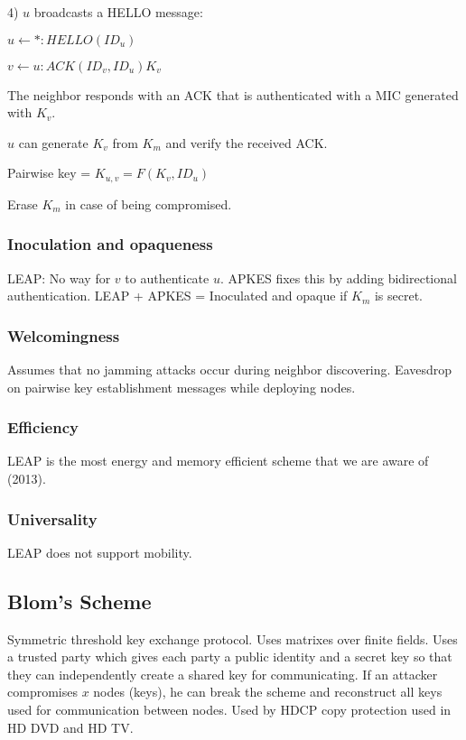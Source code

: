 \documentclass[10pt]{article}
\begin{document}
4) $u$ broadcasts a HELLO message:

$u \leftarrow *: HELLO(ID_u)$

$v \leftarrow u: ACK(ID_v, ID_u)K_v$

The neighbor responds with an ACK that is authenticated with a MIC generated with $K_v$.

$u$ can generate $K_v$ from $K_m$ and verify the received ACK.

Pairwise key = $K_{u,v} = F(K_v, ID_u)$

Erase $K_m$ in case of being compromised.


\subsubsection{Inoculation and opaqueness}

LEAP: No way for $v$ to authenticate $u$. APKES fixes this by adding bidirectional authentication. LEAP + APKES = Inoculated and opaque if $K_m$ is secret.


\subsubsection{Welcomingness}
Assumes that no jamming attacks occur during neighbor discovering. Eavesdrop on pairwise key establishment messages while deploying nodes.


\subsubsection{Efficiency}

LEAP is the most energy and memory efficient scheme that we are aware of (2013).

\subsubsection{Universality}

LEAP does not support mobility.



\subsection{Blom's Scheme}

\noindent

Symmetric threshold key exchange protocol. Uses matrixes over finite fields. Uses a trusted party which gives each party a public identity and a secret key so that they can independently create a shared key for communicating. If an attacker compromises $x$ nodes (keys), he can break the scheme and reconstruct all keys used for communication between nodes. Used by HDCP copy protection used in HD DVD and HD TV. 
\end{document}
